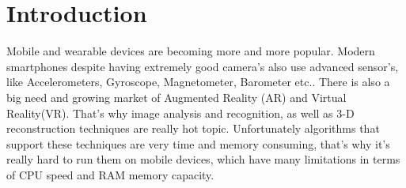 
\chapter{Introduction}
\ifpdf
    \graphicspath{{1_introduction/figures/PNG/}{1_introduction/figures/PDF/}{1_introduction/figures/}}
\else
    \graphicspath{{1_introduction/figures/EPS/}{1_introduction/figures/}}
\fi





Mobile and wearable devices are becoming more and more popular. Modern smartphones despite having extremely good camera's also use advanced sensor's, like Accelerometers, Gyroscope, Magnetometer, Barometer etc.. There is also a big need and growing market of Augmented Reality (AR) and Virtual Reality(VR). That's why image analysis and recognition, as well as 3-D reconstruction techniques are really hot topic. Unfortunately algorithms that support these techniques are very time and memory consuming, that's why it's really hard to run them on mobile devices, which have many limitations in terms of CPU speed and RAM memory capacity.

